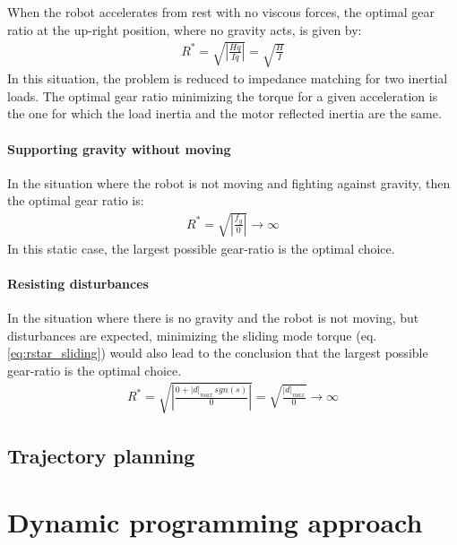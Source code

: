 When the robot accelerates from rest with no viscous forces, the optimal gear ratio at the up-right position, where no gravity acts, is given by:
\begin{align}
	R^{*}  = \sqrt{ \left | \frac{H \ddot{q} }{ I \ddot{q} } \right |   } = \sqrt{ \frac{H}{I}}
 \label{eq:impmatching}
\end{align}
In this situation, the problem is reduced to impedance matching for two inertial loads. The optimal gear ratio minimizing the torque for a given acceleration is the one for which the load inertia and the motor reflected inertia are the same.

\paragraph{Supporting gravity without moving}

In the situation where the robot is not moving and fighting against gravity, then the optimal gear ratio is:
\begin{align}
	R^{*}  = \sqrt{ \left | \frac{ f_g }{ 0 } \right |   } \rightarrow \infty
 \label{eq:gravrejection}
\end{align}
In this static case, the largest possible gear-ratio is the optimal choice. 

\paragraph{Resisting disturbances}
%
In the situation where there is no gravity and the robot is not moving, but disturbances are expected, minimizing the sliding mode torque (eq. \eqref{eq:rstar_sliding}) would also lead to the conclusion that the largest possible gear-ratio is the optimal choice.
\begin{align}
	R^{*}  = \sqrt{ \left | \frac{ 0 + | d |_{max} \, sgn( s ) }{ 0 } \right |   }  = \sqrt{  \frac{| d |_{max} }{ 0 } }\rightarrow \infty
 \label{eq:gravrejection}
\end{align}



\subsection{Trajectory planning}
\label{sec:SamplingBasedTrajectoryPlanner}

\newpage

\section{Dynamic programming approach}
\label{sec:DynamicProgrammingAproach}

